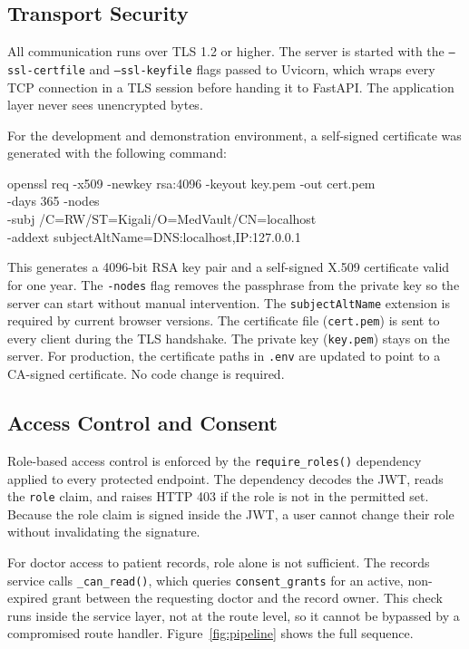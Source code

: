 \documentclass[11pt,a4paper]{article}
\begin{document}
\subsection{Transport Security}

All communication runs over TLS 1.2 or higher. The server is started with
the \texttt{--ssl-certfile} and \texttt{--ssl-keyfile} flags passed to
Uvicorn, which wraps every TCP connection in a TLS session before handing
it to FastAPI. The application layer never sees unencrypted bytes.

For the development and demonstration environment, a self-signed certificate
was generated with the following command:

\begin{center}
\small\ttfamily
openssl req -x509 -newkey rsa:4096 -keyout key.pem -out cert.pem \\
\quad -days 365 -nodes \\
\quad -subj \textquotedbl/C=RW/ST=Kigali/O=MedVault/CN=localhost\textquotedbl \\
\quad -addext \textquotedbl subjectAltName=DNS:localhost,IP:127.0.0.1\textquotedbl
\end{center}

This generates a 4096-bit RSA key pair and a self-signed X.509 certificate
valid for one year. The \texttt{-nodes} flag removes the passphrase from
the private key so the server can start without manual intervention. The
\texttt{subjectAltName} extension is required by current browser versions.
The certificate file (\texttt{cert.pem}) is sent to every client during the
TLS handshake. The private key (\texttt{key.pem}) stays on the server.
For production, the certificate paths in \texttt{.env} are updated to point
to a CA-signed certificate. No code change is required.

\subsection{Access Control and Consent}

Role-based access control is enforced by the \texttt{require\_roles()}
dependency applied to every protected endpoint. The dependency decodes the
JWT, reads the \texttt{role} claim, and raises HTTP 403 if the role is not
in the permitted set. Because the role claim is signed inside the JWT, a
user cannot change their role without invalidating the signature.

For doctor access to patient records, role alone is not sufficient. The
records service calls \texttt{\_can\_read()}, which queries
\texttt{consent\_grants} for an active, non-expired grant between the
requesting doctor and the record owner. This check runs inside the service
layer, not at the route level, so it cannot be bypassed by a compromised
route handler. Figure~\ref{fig:pipeline} shows the full sequence.
\end{document}
